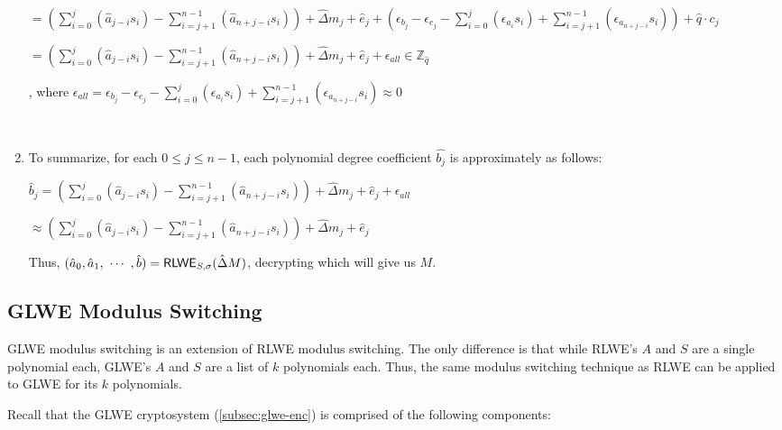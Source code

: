 \begin{enumerate}
$=  \left(\sum\limits_{i=0}^{j}(\hat{a}_{j-i}s_i) 
- \sum\limits_{i=j+1}^{n-1}(\hat{a}_{n+j-i}s_i)\right)
+ \hat{\Delta} m_j + \hat{e}_j 
+ \left(\epsilon_{b_j} - \epsilon_{e_j}
- \sum\limits_{i=0}^{j}(\epsilon_{a_i} s_i)
+ \sum\limits_{i=j+1}^{n-1}(\epsilon_{a_{n+j-i}} s_i)\right) + \hat{q} \cdot c_j
$

$=  \left(\sum\limits_{i=0}^{j}(\hat{a}_{j-i}s_i) 
- \sum\limits_{i=j+1}^{n-1}(\hat{a}_{n+j-i}s_i)\right)
+ \hat{\Delta} m_j + \hat{e}_j 
+ \epsilon_{all} \in \mathbb{Z}_{\hat{q}}
$

, where $\epsilon_{all} = \epsilon_{b_j} - \epsilon_{e_j}
- \sum\limits_{i=0}^{j}(\epsilon_{a_i} s_i)
+ \sum\limits_{i=j+1}^{n-1}(\epsilon_{a_{n+j-i}} s_i) \approx 0$


$ $

\item To summarize, for each $0 \leq j \leq n-1 $, each polynomial degree coefficient $\hat{b_j}$ is approximately as follows:

$\hat{b}_j =  \left(\sum\limits_{i=0}^{j}(\hat{a}_{j-i}s_i) 
- \sum\limits_{i=j+1}^{n-1}(\hat{a}_{n+j-i}s_i)\right)
+ \hat{\Delta} m_j + \hat{e}_j 
+ \epsilon_{all}$

$ \approx \left(\sum\limits_{i=0}^{j}(\hat{a}_{j-i}s_i) 
- \sum\limits_{i=j+1}^{n-1}(\hat{a}_{n+j-i}s_i)\right)
+ \hat{\Delta} m_j + \hat{e}_j$

Thus, $(\hat{a}_0, \hat{a}_1, \text{ } \text{$\cdots$} \text{ }, \hat{b}) = \textsf{RLWE}_{{S},\sigma}(\hat{\Delta}  M)$, decrypting which will give us $M$.

\begin{flushright}
\qedsymbol{} 
\end{flushright}

\end{enumerate}




\subsection{GLWE Modulus Switching}
\label{subsec:modulus-switch-glwe}

GLWE modulus switching is an extension of RLWE modulus switching. The only difference is that while RLWE's $A$ and $S$ are a single polynomial each, GLWE's $A$ and $S$ are a list of $k$ polynomials each. Thus, the same modulus switching technique as RLWE can be applied to GLWE for its $k$ polynomials.  

Recall that the GLWE cryptosystem (\autoref{subsec:glwe-enc}) is comprised of the following components:

